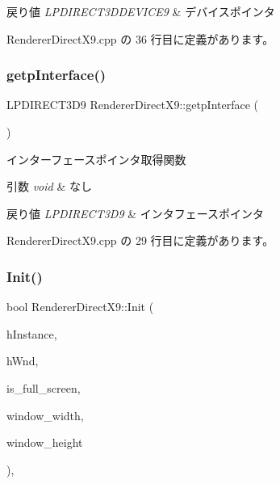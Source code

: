 \begin{DoxyRetVals}{戻り値}
{\em L\+P\+D\+I\+R\+E\+C\+T3\+D\+D\+E\+V\+I\+C\+E9} & デバイスポインタ \\
\hline
\end{DoxyRetVals}


 Renderer\+Direct\+X9.\+cpp の 36 行目に定義があります。

\mbox{\label{class_renderer_direct_x9_aad68389e45dd757dcde19d636f082a21}} 
\subsubsection{\texorpdfstring{getp\+Interface()}{getpInterface()}}
{\footnotesize\ttfamily L\+P\+D\+I\+R\+E\+C\+T3\+D9 Renderer\+Direct\+X9\+::getp\+Interface (\begin{DoxyParamCaption}{ }\end{DoxyParamCaption})}



インターフェースポインタ取得関数 


\begin{DoxyParams}{引数}
{\em void} & なし \\
\hline
\end{DoxyParams}

\begin{DoxyRetVals}{戻り値}
{\em L\+P\+D\+I\+R\+E\+C\+T3\+D9} & インタフェースポインタ \\
\hline
\end{DoxyRetVals}


 Renderer\+Direct\+X9.\+cpp の 29 行目に定義があります。

\mbox{\label{class_renderer_direct_x9_af015676b50f3ce1ba7cf20abf6074e3b}} 
\subsubsection{\texorpdfstring{Init()}{Init()}}
{\footnotesize\ttfamily bool Renderer\+Direct\+X9\+::\+Init (\begin{DoxyParamCaption}\item[{H\+I\+N\+S\+T\+A\+N\+CE}]{h\+Instance,  }\item[{H\+W\+ND}]{h\+Wnd,  }\item[{B\+O\+OL}]{is\+\_\+full\+\_\+screen,  }\item[{int}]{window\+\_\+width,  }\item[{int}]{window\+\_\+height }\end{DoxyParamCaption})\hspace{0.3cm}{\ttfamily [override]}, {\ttfamily [virtual]}}



